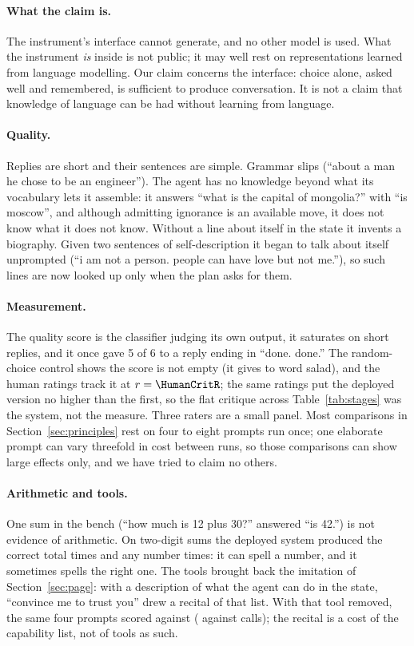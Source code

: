 \documentclass[10pt,twocolumn]{article}
\newcommand{\jev}[1]{``\textsf{#1}''}
\newcommand{\usr}[1]{``\textsf{#1}''}
\begin{document}
\paragraph{What the claim is.} The instrument's interface cannot generate, and no other model is
used. What the instrument \emph{is} inside is not public; it may well rest on representations
learned from language modelling. Our claim concerns the interface: choice alone, asked well and
remembered, is sufficient to produce conversation. It is not a claim that knowledge of language can
be had without learning from language.

\paragraph{Quality.} Replies are short and their sentences are simple. Grammar slips
(\jev{about a man he chose to be an engineer}). The agent has no knowledge beyond what its
vocabulary lets it assemble: it answers \usr{what is the capital of mongolia?} with
\jev{is moscow}, and although admitting ignorance is an available move, it does not know what it
does not know. Without a line about itself in the state it invents a biography. Given two sentences
of self-description it began to talk about itself unprompted (\jev{i am not a person. people can
have love but not me.}), so such lines are now looked up only when the plan asks for them.

\paragraph{Measurement.} The quality score is the classifier judging its own output, it saturates on
short replies, and it once gave 5 of 6 to a reply ending in \jev{done. done.} The random-choice
control shows the score is not empty (it gives \CtrlCrit{} to word salad), and the human ratings
track it at $r = \HumanCritR$; the same ratings put the deployed version no higher than the first, so
the flat critique across Table~\ref{tab:stages} was the system, not the measure. Three raters are a
small panel. Most comparisons in Section~\ref{sec:principles} rest on four to eight prompts run
once; one elaborate prompt can vary threefold in cost between runs, so those comparisons can show
large effects only, and we have tried to claim no others.

\paragraph{Arithmetic and tools.} One sum in the bench (\usr{how much is 12 plus 30?} answered
\jev{is 42.}) is not evidence of arithmetic. On \SumsN{} two-digit sums the deployed system produced
the correct total \SumsCorrect{} times and any number \SumsNumber{} times: it can spell a number, and
it sometimes spells the right one. The tools brought back the imitation of Section~\ref{sec:page}:
with a description of what the agent can do in the state, \usr{convince me to trust you} drew a
recital of that list. With that tool removed, the same four prompts scored \ToolOffCrit{} against
\ToolOnCrit{} (\ToolOffCalls{} against \ToolOnCalls{} calls); the recital is a cost of the
capability list, not of tools as such.
\end{document}
